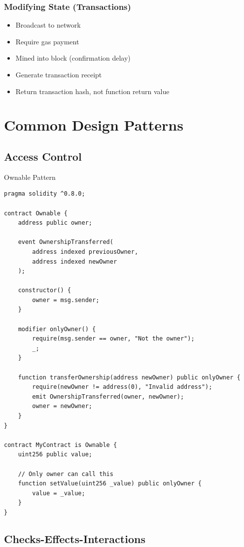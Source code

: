 \documentclass[11pt,a4paper]{article}
\begin{document}
\subsubsection{Modifying State (Transactions)}

\begin{itemize}
  \item Broadcast to network
  \item Require gas payment
  \item Mined into block (confirmation delay)
  \item Generate transaction receipt
  \item Return transaction hash, not function return value
\end{itemize}

\section{Common Design Patterns}

\subsection{Access Control}

\begin{examplebox}{Ownable Pattern}
\begin{lstlisting}[language=Solidity]
pragma solidity ^0.8.0;

contract Ownable {
    address public owner;

    event OwnershipTransferred(
        address indexed previousOwner,
        address indexed newOwner
    );

    constructor() {
        owner = msg.sender;
    }

    modifier onlyOwner() {
        require(msg.sender == owner, "Not the owner");
        _;
    }

    function transferOwnership(address newOwner) public onlyOwner {
        require(newOwner != address(0), "Invalid address");
        emit OwnershipTransferred(owner, newOwner);
        owner = newOwner;
    }
}

contract MyContract is Ownable {
    uint256 public value;

    // Only owner can call this
    function setValue(uint256 _value) public onlyOwner {
        value = _value;
    }
}
\end{lstlisting}
\end{examplebox}

\subsection{Checks-Effects-Interactions}
\end{document}
